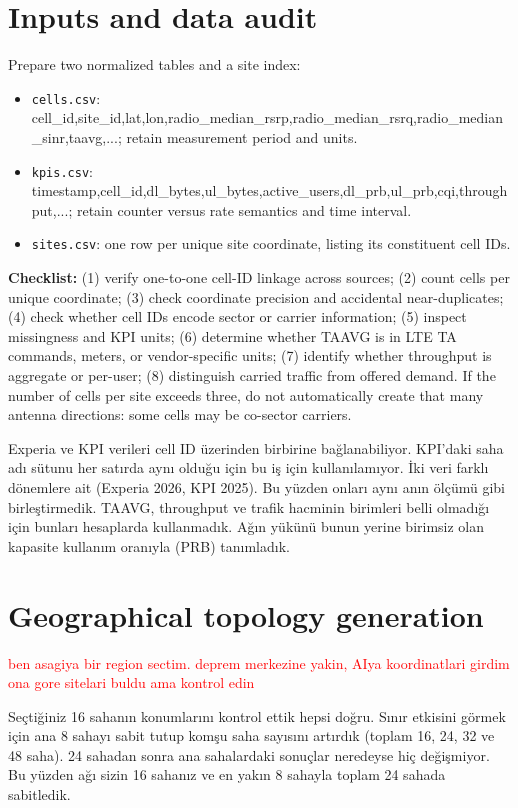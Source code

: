 \documentclass[11pt,a4paper]{article}
\newcommand{\red}[1]{\textcolor{red}{#1}}
\newenvironment{progress}{\par\smallskip\color{blue}}{\par\smallskip}
\begin{document}
\section{Inputs and data audit}
Prepare two normalized tables and a site index:
\begin{itemize}[nosep]
\item \texttt{cells.csv}: cell\_id,site\_id,lat,lon,radio\_median\_rsrp,radio\_median\_rsrq,radio\_median\_sinr,taavg,...; retain measurement period and units.
\item \texttt{kpis.csv}: timestamp,cell\_id,dl\_bytes,ul\_bytes,active\_users,dl\_prb,ul\_prb,cqi,throughput,...; retain counter versus rate semantics and time interval.
\item \texttt{sites.csv}: one row per unique site coordinate, listing its constituent cell IDs.
\end{itemize}
\textbf{Checklist:} (1) verify one-to-one cell-ID linkage across sources; (2) count cells per unique coordinate; (3) check coordinate precision and accidental near-duplicates; (4) check whether cell IDs encode sector or carrier information; (5) inspect missingness and KPI units; (6) determine whether TAAVG is in LTE TA commands, meters, or vendor-specific units; (7) identify whether throughput is aggregate or per-user; (8) distinguish carried traffic from offered demand. If the number of cells per site exceeds three, do not automatically create that many antenna directions: some cells may be co-sector carriers.

\begin{progress}
Experia ve KPI verileri cell ID üzerinden birbirine bağlanabiliyor. KPI'daki saha adı sütunu her satırda aynı olduğu için bu iş için kullanılamıyor. İki veri farklı dönemlere ait (Experia 2026, KPI 2025). Bu yüzden onları aynı anın ölçümü gibi birleştirmedik. TAAVG, throughput ve trafik hacminin birimleri belli olmadığı için bunları hesaplarda kullanmadık. Ağın yükünü bunun yerine birimsiz olan kapasite kullanım oranıyla (PRB) tanımladık.
\end{progress}

\section{Geographical topology generation}
\red{ben asagiya bir region sectim. deprem merkezine yakin, AIya koordinatlari girdim ona gore sitelari buldu ama kontrol edin}

\begin{progress}
Seçtiğiniz 16 sahanın konumlarını kontrol ettik hepsi doğru. Sınır etkisini görmek için ana 8 sahayı sabit tutup komşu saha sayısını artırdık (toplam 16, 24, 32 ve 48 saha). 24 sahadan sonra ana sahalardaki sonuçlar neredeyse hiç değişmiyor. Bu yüzden ağı sizin 16 sahanız ve en yakın 8 sahayla toplam 24 sahada sabitledik.
\end{progress}
\end{document}
